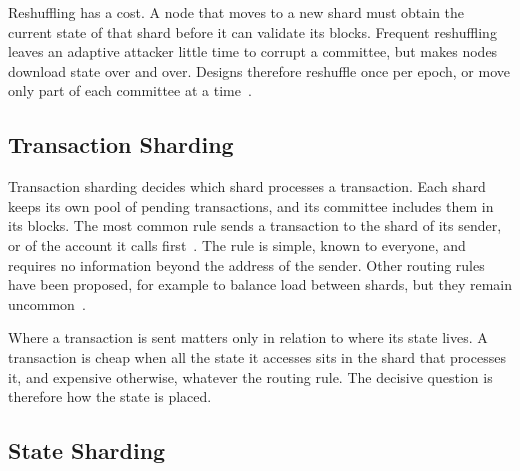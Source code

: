 Reshuffling has a cost.
A node that moves to a new shard must obtain the current state of that shard before it can validate its blocks.
Frequent reshuffling leaves an adaptive attacker little time to corrupt a committee, but makes nodes download state over and over.
Designs therefore reshuffle once per epoch, or move only part of each committee at a time~\cite{omniLedger}. 

\subsection{Transaction Sharding}\label{sec:bg:sharding:transaction}


Transaction sharding decides which shard processes a transaction.
Each shard keeps its own pool of pending transactions, and its committee includes them in its blocks.
The most common rule sends a transaction to the shard of its sender, or of the account it calls first~\cite{omniLedger,rapidchain}. 
The rule is simple, known to everyone, and requires no information beyond the address of the sender.
Other routing rules have been proposed, for example to balance load between shards, but they remain uncommon~\cite{li2025novel}.

Where a transaction is sent matters only in relation to where its state lives.
A transaction is cheap when all the state it accesses sits in the shard that processes it, and expensive otherwise, whatever the routing rule.
The decisive question is therefore how the state is placed.

\subsection{State Sharding}\label{sec:bg:sharding:state}


